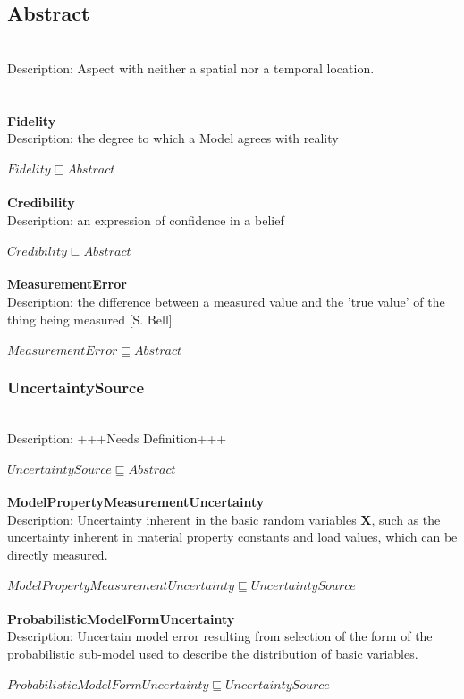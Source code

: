 \subsection{Abstract}\\
Description: Aspect with neither a spatial nor a temporal location. \cite{Pease2011}\\
\\\\   \textbf{Fidelity}\\Description: the degree to which a Model agrees with reality\\
\\$ Fidelity \sqsubseteq Abstract$
\\\\   \textbf{Credibility}\\Description: an expression of confidence in a belief\\
\\$ Credibility \sqsubseteq Abstract$
\\\\   \textbf{MeasurementError}\\Description: the difference between a measured value and the 'true value' of the thing being measured [S. Bell]\\
\\$ MeasurementError \sqsubseteq Abstract$
\subsubsection{UncertaintySource}\\
Description: +++Needs Definition+++\\
\\$ UncertaintySource \sqsubseteq Abstract$
\\\\   \textbf{ModelPropertyMeasurementUncertainty}\\Description: Uncertainty inherent in the basic random variables \textbf{X}, such as the uncertainty inherent in material property constants and load values, which can be directly measured. \cite{Kiureghian2008}\\
\\$ ModelPropertyMeasurementUncertainty \sqsubseteq UncertaintySource$
\\\\   \textbf{ProbabilisticModelFormUncertainty}\\Description: Uncertain model error resulting from selection of the form of the probabilistic sub-model used to describe the distribution of basic variables. \cite{Kiureghian2008}\\
\\$ ProbabilisticModelFormUncertainty \sqsubseteq UncertaintySource$
